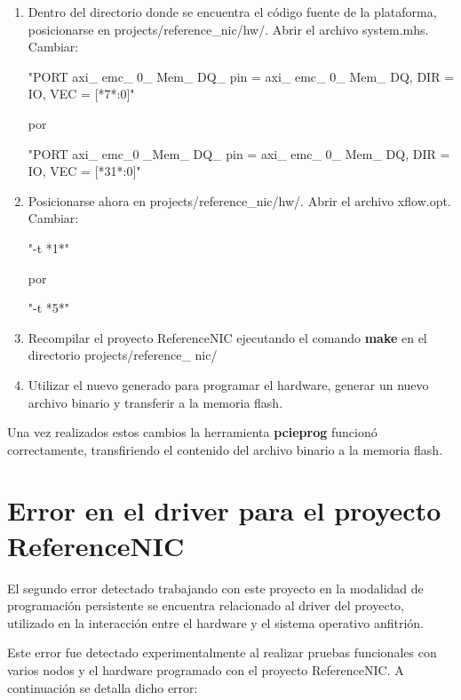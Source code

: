 \begin{enumerate}
\item Dentro del directorio donde se encuentra el c\'odigo fuente de la plataforma, posicionarse en 
	  projects/reference\_nic/hw/. Abrir el archivo system.mhs.\\
	  Cambiar:
\begin{center}
	"PORT axi\_ emc\_ 0\_ Mem\_ DQ\_ pin = axi\_ emc\_ 0\_ Mem\_ DQ, DIR = IO, VEC = [*7*:0]"
\end{center}
por
\begin{center}
"PORT axi\_ emc\_0 \_Mem\_ DQ\_ pin = axi\_ emc\_ 0\_ Mem\_ DQ, DIR = IO, VEC = [*31*:0]"
\end{center}

\item Posicionarse ahora en projects/reference\_nic/hw/. Abrir el archivo xflow.opt.\\
	  Cambiar:
\begin{center}
"-t *1*"
\end{center}
por
\begin{center}
"-t *5*"
\end{center}

\item Recompilar el proyecto ReferenceNIC ejecutando el comando \textbf{make} en el directorio projects/reference\_ nic/

\item Utilizar el nuevo  generado para programar el hardware, generar un nuevo archivo binario y transferir a la memoria flash.
\end{enumerate}

Una vez realizados estos cambios la herramienta \textbf{pcieprog} funcion\'o correctamente, transfiriendo el contenido del archivo binario a la memoria flash.
 
\section{Error en el driver para el proyecto ReferenceNIC}
El segundo error detectado trabajando con este proyecto en la modalidad de programaci\'on persistente  se encuentra relacionado al driver del proyecto, utilizado en la interacción entre el hardware y el sistema operativo anfitrión.

Este error fue detectado experimentalmente al realizar pruebas funcionales con varios nodos y el hardware programado con el proyecto ReferenceNIC. A continuación se detalla dicho error:

